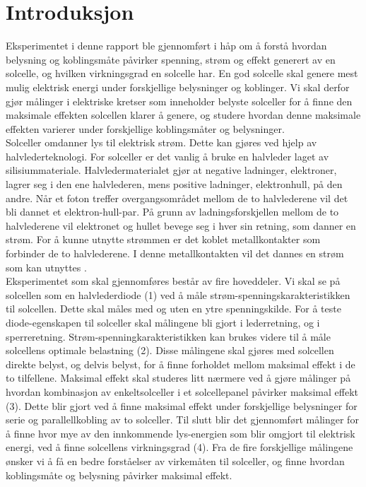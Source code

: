 \documentclass[%
 reprint,
 amsmath,amssymb,
 aps,
 norsk,
 booktabs
]{revtex4-1}
\begin{document}
\section{Introduksjon}
Eksperimentet i denne rapport ble gjennomført i håp om å forstå hvordan belysning og koblingsmåte påvirker spenning, strøm og effekt generert av en solcelle, og hvilken virkningsgrad en solcelle har. En god solcelle skal genere mest mulig elektrisk energi under forskjellige belysninger og koblinger. Vi skal derfor gjør målinger i elektriske kretser som inneholder belyste solceller for å finne den maksimale effekten solcellen klarer å genere, og studere hvordan denne maksimale effekten varierer under forskjellige koblingsmåter og belysninger.\\
Solceller omdanner lys til elektrisk strøm. Dette kan gjøres ved hjelp av halvlederteknologi. For solceller er det vanlig å bruke en halvleder laget av silisiummateriale. Halvledermaterialet gjør at negative ladninger, elektroner, lagrer seg i den ene halvlederen, mens positive ladninger, elektronhull, på den andre. Når et foton treffer overgangsområdet mellom de to halvlederene vil det bli dannet et elektron-hull-par. På grunn av ladningsforskjellen mellom de to halvlederene vil elektronet og hullet bevege seg i hver sin retning, som danner en strøm. For å kunne utnytte strømmen er det koblet metallkontakter som forbinder de to halvlederene. I denne metallkontakten vil det dannes en strøm som kan utnyttes \cite{snl}.\\
Eksperimentet som skal gjennomføres består av fire hoveddeler. Vi skal se på solcellen som en halvlederdiode (1) ved å måle strøm-spenningskarakteristikken til solcellen. Dette skal måles med og uten en ytre spenningskilde. For å teste diode-egenskapen til solceller skal målingene bli gjort i lederretning, og i sperreretning. Strøm-spenningkarakteristikken kan brukes videre til å måle solcellens optimale belastning (2). Disse målingene skal gjøres med solcellen direkte belyst, og delvis belyst, for å finne forholdet mellom maksimal effekt i de to tilfellene. Maksimal effekt skal studeres litt nærmere ved å gjøre målinger på hvordan kombinasjon av enkeltsolceller i et solcellepanel påvirker maksimal effekt (3). Dette blir gjort ved å finne maksimal effekt under forskjellige belysninger for serie og parallellkobling av to solceller. Til slutt blir det gjennomført målinger for å finne hvor mye av den innkommende lys-energien som blir omgjort til elektrisk energi, ved å finne solcellens virkningsgrad (4). Fra de fire forskjellige målingene ønsker vi å få en bedre forståelser av virkemåten til solceller, og finne hvordan koblingsmåte og belysning påvirker maksimal effekt. \\
\end{document}
